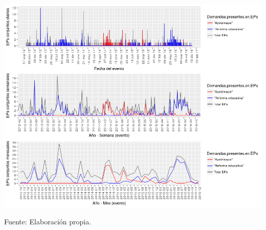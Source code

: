 \documentclass[letterpaper, 11pt]{book}
\theoremstyle{definition}
\theoremstyle{remark}
\begin{document}
\hspace{-1em}\begin{minipage}{\linewidth}
\centering
{} \label{3.17_serieDemandas}
\hspace{-1.5em}\includegraphics[scale=0.62]{img/3.17_serieDemandas.png}
\par\medskip
\small Fuente: Elaboración propia.
\end{minipage}\medskip
\end{document}
